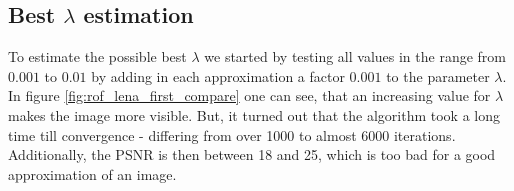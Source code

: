     \subsection{Best $\lambda$ estimation}
    \label{sub:best_lambda_estimation_rof}

        To estimate the possible best $\lambda$ we started by testing all values in the range from $0.001$ to $0.01$ by adding in each approximation a factor $0.001$ to the parameter $\lambda$. In figure \ref{fig:rof_lena_first_compare} one can see, that an increasing value for $\lambda$ makes the image more visible. But, it turned out that the algorithm took a long time till convergence - differing from over 1000 to almost 6000 iterations. Additionally, the PSNR is then between 18 and 25, which is too bad for a good approximation of an image.

